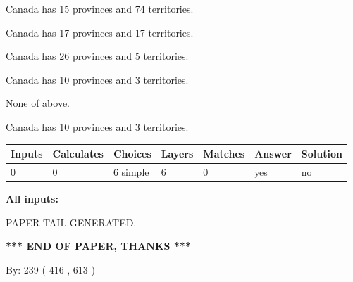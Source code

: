\documentclass[12pt]{article}
\begin{document}
 
Canada has  15 provinces and  74 territories.
 
 
Canada has  17 provinces and  17 territories.
 
 
Canada has  26 provinces and  5 territories.
 
 
Canada has 10  provinces and 3 territories.
 
 
 None of above.
 
 
\noindent{}
 
 
Canada has 10  provinces and 3 territories.
 
 
\noindent{}
 
 
   
   
   
   
\noindent\begin{tabular}{|l|l|l|l|l|l|l|}
 \hline
Inputs & Calculates & Choices & Layers & Matches & Answer & Solution \\ \hline
 0  & 
 0  & 
 6
  simple  
  & 
 6  & 
 0  & 
  yes & 
  no 
  \\ \hline
 \end{tabular}
   
   
   
   
\noindent{}
   
   
   
   
\noindent\vspace{0.1in}\hspace{-0.08in} {\textbf{\Large{All inputs: }}}
   
   
   
   
   
   
 \vspace{0.2in}
 
   
   
\vspace{2.0in} PAPER TAIL GENERATED.
   
   
   
   
\vspace{1.0in} 
{\textbf{\large{ *** END OF PAPER, THANKS *** }}} 
   
   
\hspace{1.0in} By: 
 239 ( 416 ,  613 )
   
\end{document}
